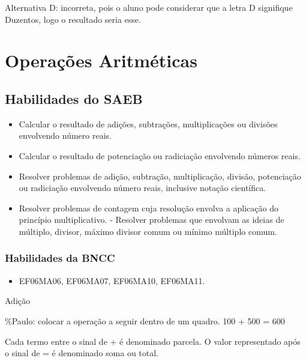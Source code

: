 Alternativa D: incorreta, pois o aluno pode considerar que a letra D
signifique Duzentos, logo o resultado seria esse.

\chapter{Operações Aritméticas}

\section{Habilidades do SAEB}  

\begin{itemize}

    \item 
Calcular o resultado de adições, subtrações,
multiplicações ou divisões envolvendo número reais. 

    \item Calcular o
resultado de potenciação ou radiciação envolvendo números reais.

    \item
  Resolver problemas de adição, subtração, multiplicação, divisão,
  potenciação ou radiciação envolvendo número reais, inclusive notação
  científica.

    \item
  Resolver problemas de contagem cuja resolução envolva a aplicação do
  princípio multiplicativo. - Resolver problemas que envolvam as ideias
  de múltiplo, divisor, máximo divisor comum ou mínimo múltiplo comum.

\end{itemize}

\subsection{Habilidades da BNCC} 

\begin{itemize}

    \item EF06MA06, EF06MA07, EF06MA10, EF06MA11.

\end{itemize}

Adição

\%Paulo: colocar a operação a seguir dentro de um quadro. 100 + 500 =
600

Cada termo entre o sinal de + é denominado parcela. O valor representado
após o sinal de = é denominado soma ou total.

